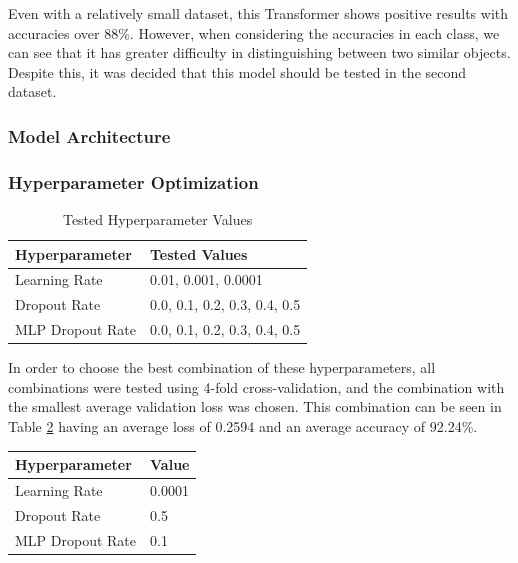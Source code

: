 \kern 0.1cm

Even with a relatively small dataset, this Transformer shows positive results with accuracies over 88\%. However, when considering the accuracies in each class, we can see that it has greater difficulty in distinguishing between two similar objects. Despite this, it was decided that this model should be tested in the second dataset.

\subsubsection{Model Architecture}

\subsubsection{Hyperparameter Optimization}

\begin{table}[H]
\caption{Tested Hyperparameter Values}
\label{table:transformer_hyperparameters}
\centering
\begin{tabular}{|l|l|}
\hline
Hyperparameter & Tested Values\\
\hline
Learning Rate & 0.01, 0.001, 0.0001\\
\hline
Dropout Rate & 0.0, 0.1, 0.2, 0.3, 0.4, 0.5\\
\hline
MLP Dropout Rate & 0.0, 0.1, 0.2, 0.3, 0.4, 0.5\\
\hline
\end{tabular}
\end{table}

In order to choose the best combination of these hyperparameters, all combinations were
tested using 4-fold cross-validation, and the combination with the smallest average validation loss was chosen. This combination can be seen in Table \ref{table:transformer_best_hyperparameters}
having an average loss of 0.2594 and an average accuracy of 92.24\%.

\begin{table}[H]
\label{table:transformer_best_hyperparameters}
\centering
\begin{tabular}{|l|l|}
\hline
Hyperparameter & Value \\
\hline
Learning Rate & 0.0001 \\
\hline
Dropout Rate & 0.5 \\
\hline
MLP Dropout Rate & 0.1 \\
\hline
\end{tabular}
\end{table}

